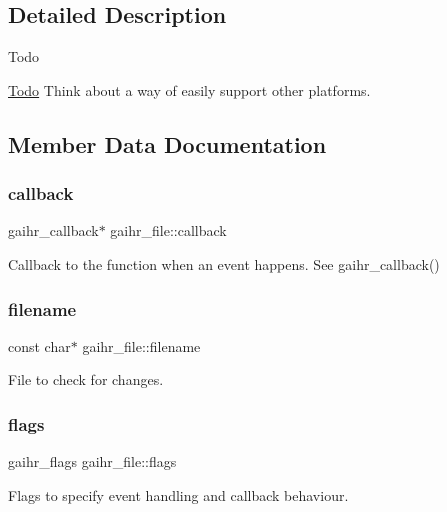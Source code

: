 \subsection{Detailed Description}
\begin{DoxyRefDesc}{Todo}
\item[\hyperlink{todo__todo000001}{Todo}]Think about a way of easily support other platforms. \end{DoxyRefDesc}


\subsection{Member Data Documentation}
\mbox{\label{structgaihr__file_a9ac45c0142ff1eaf591b870e163d7f31}} 
\subsubsection{\texorpdfstring{callback}{callback}}
{\footnotesize\ttfamily gaihr\+\_\+callback$\ast$ gaihr\+\_\+file\+::callback}

Callback to the function when an event happens. See gaihr\+\_\+callback() \mbox{\label{structgaihr__file_a26ea2bbf62231c3cae2317ca217f8166}} 
\subsubsection{\texorpdfstring{filename}{filename}}
{\footnotesize\ttfamily const char$\ast$ gaihr\+\_\+file\+::filename}

File to check for changes. \mbox{\label{structgaihr__file_ab6eef82d50a8a51d161de3ab7ad98ee9}} 
\subsubsection{\texorpdfstring{flags}{flags}}
{\footnotesize\ttfamily gaihr\+\_\+flags gaihr\+\_\+file\+::flags}

Flags to specify event handling and callback behaviour. \mbox{\label{structgaihr__file_a38b2bc43116a1fd59715ca1714d80462}} 
